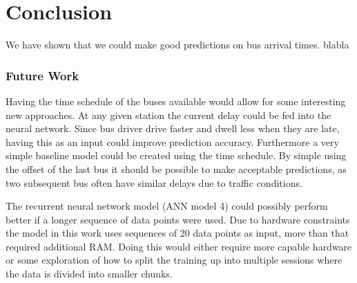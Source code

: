 
\chapter{Conclusion}
\label{cha:conclusion}

We have shown that we could make good predictions on bus arrival times. blabla

\subsection{Future Work}
Having the time schedule of the buses available would allow for some interesting new approaches. At any given station the current delay could be fed into the neural network. Since bus driver drive faster and dwell less when they are late, having this as an input could improve prediction accuracy. Furthermore a very simple baseline model could be created using the time schedule. By simple using the offset of the last bus it should be possible to make acceptable predictions, as two subsequent bus often have similar delays due to traffic conditions.

The recurrent neural network model (ANN model 4) could possibly perform better if a longer sequence of data points were used. Due to hardware constraints the model in this work uses sequences of 20 data points as input, more than that required additional RAM. Doing this would either require more capable hardware or some exploration of how to split the training up into multiple sessions where the data is divided into smaller chunks.

